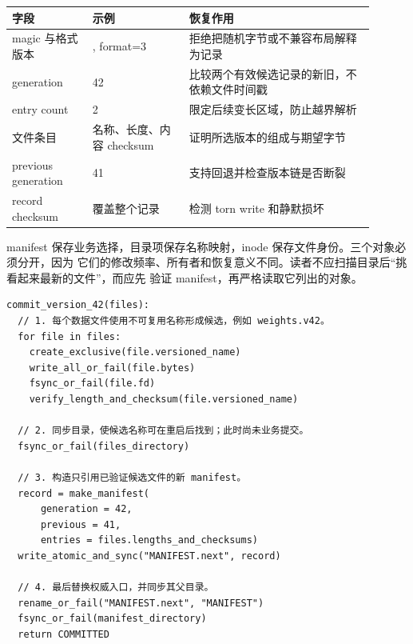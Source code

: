 \begin{longtable}{|L{0.2\linewidth}|L{0.24\linewidth}|L{0.46\linewidth}|}
\hline
字段 & 示例 & 恢复作用 \\ \hline
magic 与格式版本 & , format=3 & 拒绝把随机字节或不兼容布局解释为记录 \\\tablerowrule
generation & 42 & 比较两个有效候选记录的新旧，不依赖文件时间戳 \\\tablerowrule
entry count & 2 & 限定后续变长区域，防止越界解析 \\\tablerowrule
文件条目 & 名称、长度、内容 checksum & 证明所选版本的组成与期望字节 \\\tablerowrule
previous generation & 41 & 支持回退并检查版本链是否断裂 \\\tablerowrule
record checksum & 覆盖整个记录 & 检测 torn write 和静默损坏 \\
\hline
\end{longtable}

manifest 保存业务选择，目录项保存名称映射，inode 保存文件身份。三个对象必须分开，因为
它们的修改频率、所有者和恢复意义不同。读者不应扫描目录后“挑看起来最新的文件”，而应先
验证 manifest，再严格读取它列出的对象。

\begin{lstlisting}
commit_version_42(files):
  // 1. 每个数据文件使用不可复用名称形成候选，例如 weights.v42。
  for file in files:
    create_exclusive(file.versioned_name)
    write_all_or_fail(file.bytes)
    fsync_or_fail(file.fd)
    verify_length_and_checksum(file.versioned_name)

  // 2. 同步目录，使候选名称可在重启后找到；此时尚未业务提交。
  fsync_or_fail(files_directory)

  // 3. 构造只引用已验证候选文件的新 manifest。
  record = make_manifest(
      generation = 42,
      previous = 41,
      entries = files.lengths_and_checksums)
  write_atomic_and_sync("MANIFEST.next", record)

  // 4. 最后替换权威入口，并同步其父目录。
  rename_or_fail("MANIFEST.next", "MANIFEST")
  fsync_or_fail(manifest_directory)
  return COMMITTED
\end{lstlisting}

